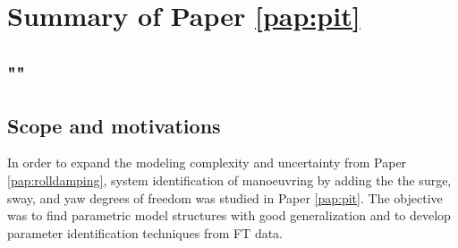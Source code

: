 \section{Summary of Paper \ref{pap:pit}}
\subsection*{""}
\subsection*{Scope and motivations}
In order to expand the modeling complexity and uncertainty from Paper \ref{pap:rolldamping}, system identification of manoeuvring by adding the the surge, sway, and yaw degrees of freedom was studied in Paper \ref{pap:pit}. 
The objective was to find parametric model structures with good generalization and to develop parameter identification techniques from FT data.


